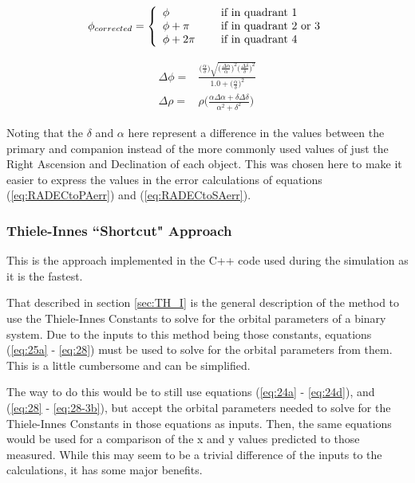 \documentclass[12pt,preprint]{aastex}
\begin{document}
\begin{equation}\label{eq:4.1.PAcorrection}
\phi_{corrected} = \left\{ \begin{array}{l l l} \phi& \quad \text{ if in quadrant 1}\\ \phi + \pi& \quad \text{ if in quadrant 2 or 3}\\ \phi + 2\pi& \quad \text{ if in quadrant 4}  \end{array} \right.
\end{equation}

\begin{subequations}
\begin{align}\label{eq:RADECtoPAerr}
\Delta\phi =&   \frac{\bigg(\frac{\alpha}{\delta}\bigg) \sqrt{\bigg( \frac{\Delta\alpha}{\alpha} \bigg)^2 \bigg( \frac{\Delta\delta}{\delta} \bigg)^2} }{1.0+\bigg(\frac{\alpha}{\delta} \bigg)^2}\\
\label{eq:RADECtoSAerr}
\Delta\rho =&   \rho\Bigg(\frac{\alpha\Delta\alpha + \delta\Delta\delta}{\alpha^2 + \delta^2} \Bigg)
\end{align}
\end{subequations}

Noting that the $\delta$ and $\alpha$ here represent a difference in the values between the primary and companion instead of the more commonly used values of just the Right Ascension and Declination of each object.  This was chosen here to make it easier to express the values in the error calculations of equations (\ref{eq:RADECtoPAerr}) and (\ref{eq:RADECtoSAerr}).

\clearpage
\subsubsection{Thiele-Innes ``Shortcut" Approach}\label{sec:TH_I_shortcut}

This is the approach implemented in the C++ code used during the simulation as it is the fastest.

That described in section \ref{sec:TH_I} is the general description of the method to use the Thiele-Innes Constants to solve for the orbital parameters of a binary system.  Due to the inputs to this method being those constants, equations (\ref{eq:25a} - \ref{eq:28}) must be used to solve for the orbital parameters from them.  This is a little cumbersome and can be simplified.

The way to do this would be to still use equations (\ref{eq:24a} - \ref{eq:24d}), and (\ref{eq:28} - \ref{eq:28-3b}), but accept the orbital parameters needed to solve for the Thiele-Innes Constants in those equations as inputs.  Then, the same equations would be used for a comparison of the x and y values predicted to those measured.  While this may seem to be a trivial difference of the inputs to the calculations, it has some major benefits.
\end{document}
